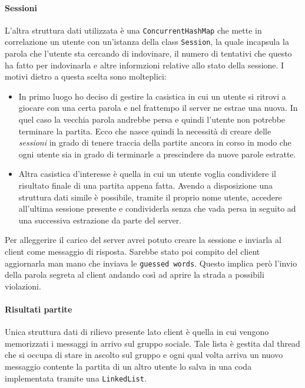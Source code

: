 \paragraph{Sessioni}
L'altra struttura dati utilizzata è una \verb|ConcurrentHashMap| che mette in correlazione un
utente con un'istanza della class \verb|Session|, la quale incapsula la parola che l'utente sta
cercando di indovinare, il numero di tentativi che questo ha fatto per indovinarla e altre
informzioni relative allo stato della sessione. I motivi dietro a questa scelta sono molteplici:
\begin{itemize}
	\item In primo luogo ho deciso di gestire la casistica in cui un utente si ritrovi a giocare
	      con una certa parola e nel frattempo il server ne estrae una nuova. In quel caso la
	      vecchia parola andrebbe persa e quindi l'utente non potrebbe terminare la partita. Ecco
	      che nasce quindi la necessità di creare delle \emph{sessioni} in grado di tenere
	      traccia della partite ancora in corso in modo che ogni utente sia in grado di
	      terminarle a prescindere da nuove parole estratte.
	\item Altra casistica d'interesse è quella in cui un utente voglia condividere il risultato
	      finale di una partita appena fatta. Avendo a disposizione una struttura dati simile è
	      possibile, tramite il proprio nome utente, accedere all'ultima sessione presente e
	      condividerla senza che vada persa in seguito ad una successiva estrazione da parte del
	      server.
\end{itemize}
Per alleggerire il carico del server avrei potuto creare la sessione e inviarla al client come
messaggio di risposta. Sarebbe stato poi compito del client aggiornarla man mano che inviava le
\verb|guessed words|. Questo implica però l'invio della parola segreta al client andando così ad
aprire la strada a possibili violazioni.

\paragraph{Risultati partite}
Unica struttura dati di rilievo presente lato client è quella in cui vengono memorizzati i
messaggi in arrivo sul gruppo sociale. Tale lista è gestita dal thread che si occupa di stare in
ascolto sul gruppo e ogni qual volta arriva un nuovo messaggio contente la partita di un altro
utente lo salva in una coda implementata tramite una \verb|LinkedList|.

